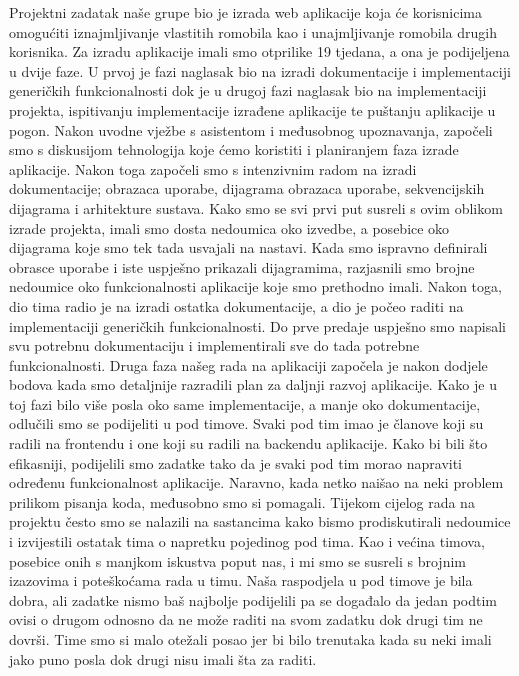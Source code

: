 		
		Projektni zadatak naše grupe bio je izrada web aplikacije koja će korisnicima omogućiti iznajmljivanje vlastitih romobila kao i unajmljivanje romobila drugih korisnika. \newline
		Za izradu aplikacije imali smo otprilike 19 tjedana, a ona je podijeljena u dvije faze.
		U prvoj je fazi naglasak bio na izradi dokumentacije i implementaciji generičkih funkcionalnosti dok je u drugoj fazi naglasak bio na implementaciji projekta, ispitivanju implementacije izrađene aplikacije te puštanju aplikacije u pogon.
		Nakon uvodne vježbe s asistentom i međusobnog upoznavanja, započeli smo s diskusijom tehnologija koje ćemo koristiti i planiranjem faza izrade aplikacije. Nakon toga započeli smo s intenzivnim radom na izradi dokumentacije; obrazaca uporabe, dijagrama obrazaca uporabe, sekvencijskih dijagrama i arhitekture sustava.
		Kako smo se svi prvi put susreli s ovim oblikom izrade projekta, imali smo dosta nedoumica oko izvedbe, a posebice oko dijagrama koje smo tek tada usvajali na nastavi. Kada smo ispravno definirali obrasce uporabe i iste uspješno prikazali dijagramima, razjasnili smo brojne nedoumice oko funkcionalnosti aplikacije koje smo prethodno imali. Nakon toga, dio tima radio je na izradi ostatka dokumentacije, a dio je počeo raditi na implementaciji generičkih funkcionalnosti. Do prve predaje uspješno smo napisali svu potrebnu dokumentaciju i implementirali sve do tada potrebne funkcionalnosti. \newline
		Druga faza našeg rada na aplikaciji započela je nakon dodjele bodova kada smo detaljnije razradili plan za daljnji razvoj aplikacije. Kako je u toj fazi bilo više posla oko same implementacije, a manje oko dokumentacije, odlučili smo se podijeliti u pod timove. Svaki pod tim imao je članove koji su  radili na frontendu i one koji su radili na backendu aplikacije. Kako bi bili što efikasniji, podijelili smo zadatke tako da je svaki pod tim morao napraviti određenu funkcionalnost aplikacije. Naravno, kada netko naišao na neki problem prilikom pisanja koda, međusobno smo si pomagali. Tijekom cijelog rada na projektu često smo se nalazili na sastancima kako bismo prodiskutirali nedoumice i izvijestili ostatak tima o napretku pojedinog pod tima. Kao i većina timova, posebice onih s manjkom iskustva poput nas,  i mi smo se susreli s brojnim izazovima i poteškoćama rada u timu. Naša raspodjela u pod timove je bila dobra, ali zadatke nismo baš najbolje podijelili pa se događalo da jedan podtim ovisi o drugom odnosno da ne može raditi na svom zadatku dok drugi tim ne dovrši. Time smo si malo otežali posao jer bi bilo trenutaka kada su neki imali jako puno posla dok drugi nisu imali šta za raditi. 
		\eject 